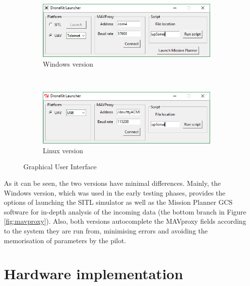 \begin{figure}[htbp]
	\centering

	\begin{subfigure}[b]{0.7\textwidth}
		\includegraphics[width=\textwidth]{./figures/GUIwin.png}
		\caption{Windows version}
	\end{subfigure}
	~\\[1ex]
	\begin{subfigure}[b]{0.7\textwidth}
		\includegraphics[width=\textwidth]{./figures/GUIlinux.png}
		\caption{Linux version}
	\end{subfigure}

	\caption{Graphical User Interface}
	\label{fig:gui}
\end{figure}

As it can be seen, the two versions have minimal differences.
Mainly, the Windows version, which was used in the early testing phases, provides the options of launching the SITL simulator as well as the Mission Planner GCS software for in-depth analysis of the incoming data (the bottom branch in Figure \ref{fig:mavproxy}).
Also, both versions autocomplete the MAVproxy fields according to the system they are run from, minimising errors and avoiding the memorisation of parameters by the pilot.


\section{Hardware implementation}
